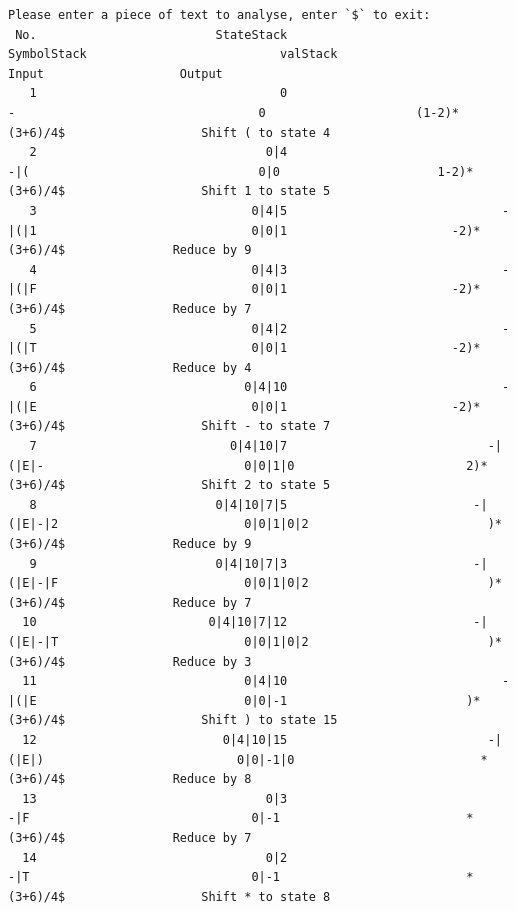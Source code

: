 \documentclass[UTF8]{ctexart}
\begin{document}
\begin{lstlisting}
Please enter a piece of text to analyse, enter `$` to exit:
 No.                         StateStack                        SymbolStack                           valStack                              Input                   Output
   1                                  0                                  -                                  0                     (1-2)*(3+6)/4$                   Shift ( to state 4
   2                                0|4                                -|(                                0|0                      1-2)*(3+6)/4$                   Shift 1 to state 5
   3                              0|4|5                              -|(|1                              0|0|1                       -2)*(3+6)/4$               Reduce by 9
   4                              0|4|3                              -|(|F                              0|0|1                       -2)*(3+6)/4$               Reduce by 7
   5                              0|4|2                              -|(|T                              0|0|1                       -2)*(3+6)/4$               Reduce by 4
   6                             0|4|10                              -|(|E                              0|0|1                       -2)*(3+6)/4$                   Shift - to state 7
   7                           0|4|10|7                            -|(|E|-                            0|0|1|0                        2)*(3+6)/4$                   Shift 2 to state 5
   8                         0|4|10|7|5                          -|(|E|-|2                          0|0|1|0|2                         )*(3+6)/4$               Reduce by 9
   9                         0|4|10|7|3                          -|(|E|-|F                          0|0|1|0|2                         )*(3+6)/4$               Reduce by 7
  10                        0|4|10|7|12                          -|(|E|-|T                          0|0|1|0|2                         )*(3+6)/4$               Reduce by 3
  11                             0|4|10                              -|(|E                             0|0|-1                         )*(3+6)/4$                   Shift ) to state 15
  12                          0|4|10|15                            -|(|E|)                           0|0|-1|0                          *(3+6)/4$               Reduce by 8
  13                                0|3                                -|F                               0|-1                          *(3+6)/4$               Reduce by 7
  14                                0|2                                -|T                               0|-1                          *(3+6)/4$                   Shift * to state 8

\end{lstlisting}
\end{document}

